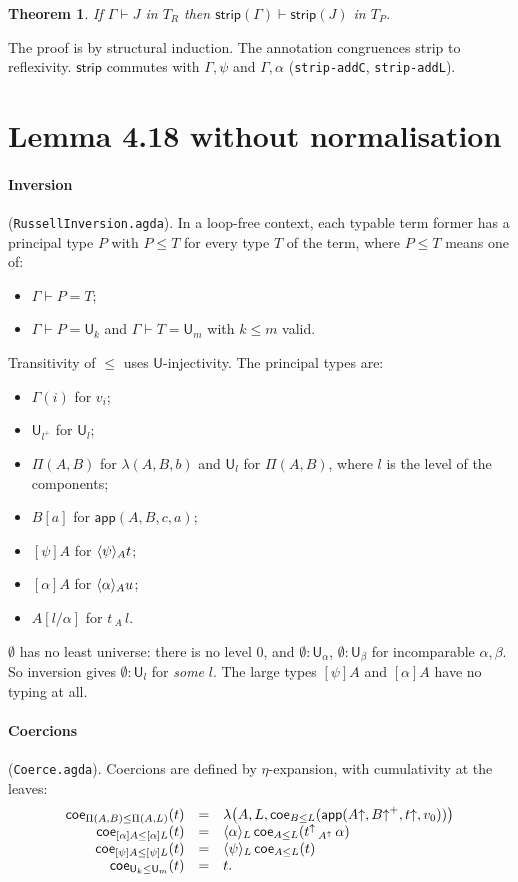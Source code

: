 \documentclass[10pt]{article}
\newcommand{\U}{\mathsf{U}}
\newcommand{\lam}{\lambda}
\newcommand{\app}{\mathsf{app}}
\newcommand{\strip}{\mathsf{strip}}
\newcommand{\coe}{\mathsf{coe}}
\newcommand{\TR}{T_R}
\newcommand{\TP}{T_P}
\newcommand{\Emp}{\emptyset}
\newcommand{\grd}[2]{[#1]#2}
\newcommand{\glam}[2]{\langle #1\rangle #2}
\newcommand{\lpi}[1]{[\alpha]#1}
\newcommand{\llam}[1]{\langle\alpha\rangle #1}
\newcommand{\up}{{\uparrow}}
\newcommand{\agda}[1]{\texttt{#1}}
\newtheorem{theorem}{Theorem}
\theoremstyle{remark}
\begin{document}
\begin{theorem}
If $\Gamma\vdash J$ in $\TR$ then $\strip(\Gamma)\vdash\strip(J)$ in $\TP$.
\end{theorem}
\noindent
The proof is by structural induction.  The annotation congruences strip to
reflexivity.  $\strip$ commutes with $\Gamma,\psi$ and $\Gamma,\alpha$
(\agda{strip-addC}, \agda{strip-addL}).

\section{Lemma 4.18 without normalisation}\label{sec:nf}

\paragraph{Inversion} (\agda{RussellInversion.agda}).  In a loop-free
context, each typable term former has a principal type $P$ with $P\le T$ for
every type $T$ of the term, where $P\le T$ means one of:
\begin{itemize}
\item $\Gamma\vdash P=T$;
\item $\Gamma\vdash P=\U_k$ and $\Gamma\vdash T=\U_m$ with $k\le m$ valid.
\end{itemize}
Transitivity of $\le$ uses $\U$-injectivity.  The principal types are:
\begin{itemize}
\item $\Gamma(i)$ for $v_i$;
\item $\U_{l^+}$ for $\U_l$;
\item $\Pi(A,B)$ for $\lam(A,B,b)$ and $\U_l$ for $\Pi(A,B)$, where $l$ is
  the level of the components;
\item $B[a]$ for $\app(A,B,c,a)$;
\item $\grd\psi A$ for $\glam\psi_A t$;
\item $\lpi A$ for $\llam_A u$;
\item $A[l/\alpha]$ for $t\,{}_A\,l$.
\end{itemize}
$\Emp$ has no least universe: there is no level $0$, and
$\Emp:\U_{\alpha}$, $\Emp:\U_\beta$ for incomparable $\alpha,\beta$.  So
inversion gives $\Emp:\U_l$ for \emph{some} $l$.  The large types
$\grd\psi A$ and $\lpi A$ have no typing at all.

\paragraph{Coercions} (\agda{Coerce.agda}).  Coercions are defined by
$\eta$-expansion, with cumulativity at the leaves:
\[
\begin{array}{rcl}
\coe_{\Pi(A,B)\le\Pi(A,L)}(t)&=&\lam\bigl(A,L,\coe_{B\le L}(\app(A\up,B\up^+,t\up,v_0))\bigr)\\
\coe_{\lpi A\le\lpi L}(t)&=&\llam_L\,\coe_{A\le L}(t^\up\,{}_{A^\up}\,\alpha)\\
\coe_{\grd\psi A\le\grd\psi L}(t)&=&\glam\psi_L\,\coe_{A\le L}(t)\\
\coe_{\U_k\le\U_m}(t)&=&t .
\end{array}
\]
\end{document}
